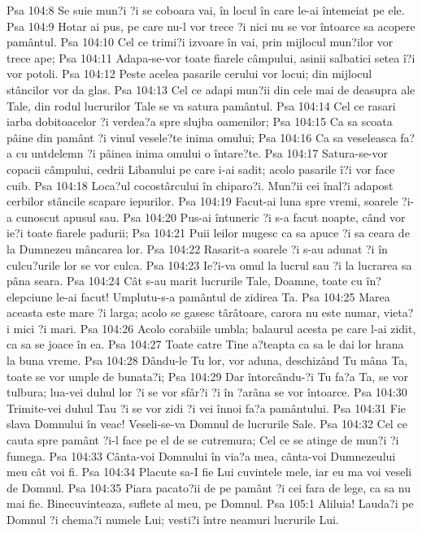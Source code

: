 Psa 104:8  Se suie mun?i ?i se coboara vai, în locul în care le-ai întemeiat pe ele.
Psa 104:9  Hotar ai pus, pe care nu-l vor trece ?i nici nu se vor întoarce sa acopere pamântul.
Psa 104:10  Cel ce trimi?i izvoare în vai, prin mijlocul mun?ilor vor trece ape;
Psa 104:11  Adapa-se-vor toate fiarele câmpului, asinii salbatici setea î?i vor potoli.
Psa 104:12  Peste acelea pasarile cerului vor locui; din mijlocul stâncilor vor da glas.
Psa 104:13  Cel ce adapi mun?ii din cele mai de deasupra ale Tale, din rodul lucrurilor Tale se va satura pamântul.
Psa 104:14  Cel ce rasari iarba dobitoacelor ?i verdea?a spre slujba oamenilor;
Psa 104:15  Ca sa scoata pâine din pamânt ?i vinul vesele?te inima omului;
Psa 104:16  Ca sa veseleasca fa?a cu untdelemn ?i pâinea inima omului o întare?te.
Psa 104:17  Satura-se-vor copacii câmpului, cedrii Libanului pe care i-ai sadit; acolo pasarile î?i vor face cuib.
Psa 104:18  Loca?ul cocostârcului în chiparo?i. Mun?ii cei înal?i adapost cerbilor stâncile scapare iepurilor.
Psa 104:19  Facut-ai luna spre vremi, soarele ?i-a cunoscut apusul sau.
Psa 104:20  Pus-ai întuneric ?i s-a facut noapte, când vor ie?i toate fiarele padurii;
Psa 104:21  Puii leilor mugesc ca sa apuce ?i sa ceara de la Dumnezeu mâncarea lor.
Psa 104:22  Rasarit-a soarele ?i s-au adunat ?i în culcu?urile lor se vor culca.
Psa 104:23  Ie?i-va omul la lucrul sau ?i la lucrarea sa pâna seara.
Psa 104:24  Cât s-au marit lucrurile Tale, Doamne, toate cu în?elepciune le-ai facut! Umplutu-s-a pamântul de zidirea Ta.
Psa 104:25  Marea aceasta este mare ?i larga; acolo se gasesc târâtoare, carora nu este numar, vieta?i mici ?i mari.
Psa 104:26  Acolo corabiile umbla; balaurul acesta pe care l-ai zidit, ca sa se joace în ea.
Psa 104:27  Toate catre Tine a?teapta ca sa le dai lor hrana la buna vreme.
Psa 104:28  Dându-le Tu lor, vor aduna, deschizând Tu mâna Ta, toate se vor umple de bunata?i;
Psa 104:29  Dar întorcându-?i Tu fa?a Ta, se vor tulbura; lua-vei duhul lor ?i se vor sfâr?i ?i în ?arâna se vor întoarce.
Psa 104:30  Trimite-vei duhul Tau ?i se vor zidi ?i vei înnoi fa?a pamântului.
Psa 104:31  Fie slava Domnului în veac! Veseli-se-va Domnul de lucrurile Sale.
Psa 104:32  Cel ce cauta spre pamânt ?i-l face pe el de se cutremura; Cel ce se atinge de mun?i ?i fumega.
Psa 104:33  Cânta-voi Domnului în via?a mea, cânta-voi Dumnezeului meu cât voi fi.
Psa 104:34  Placute sa-I fie Lui cuvintele mele, iar eu ma voi veseli de Domnul.
Psa 104:35  Piara pacato?ii de pe pamânt ?i cei fara de lege, ca sa nu mai fie. Binecuvinteaza, suflete al meu, pe Domnul.
Psa 105:1  Aliluia! Lauda?i pe Domnul ?i chema?i numele Lui; vesti?i între neamuri lucrurile Lui.

